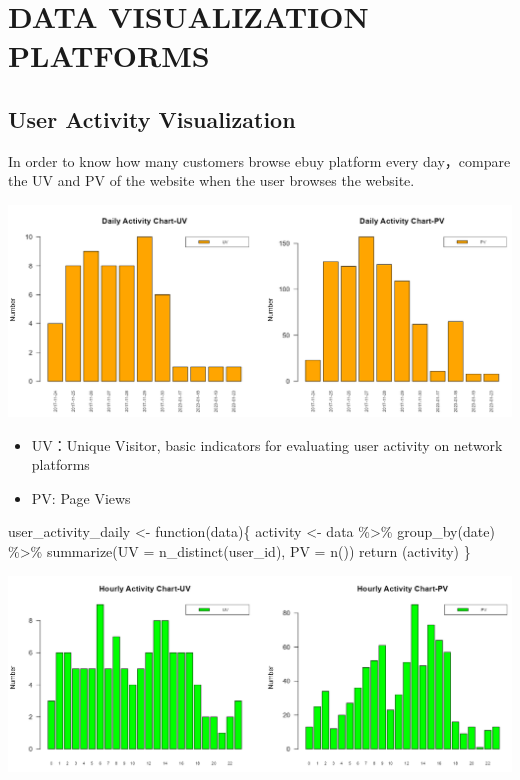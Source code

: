 \documentclass[
  11pt,
]{article}
\newenvironment{Shaded}{\begin{snugshade}}{\end{snugshade}}
\newcommand{\AttributeTok}[1]{\textcolor[rgb]{0.40,0.45,0.13}{#1}}
\newcommand{\ControlFlowTok}[1]{\textcolor[rgb]{0.00,0.23,0.31}{#1}}
\newcommand{\FunctionTok}[1]{\textcolor[rgb]{0.28,0.35,0.67}{#1}}
\newcommand{\NormalTok}[1]{\textcolor[rgb]{0.00,0.23,0.31}{#1}}
\newcommand{\OtherTok}[1]{\textcolor[rgb]{0.00,0.23,0.31}{#1}}
\newcommand{\SpecialCharTok}[1]{\textcolor[rgb]{0.37,0.37,0.37}{#1}}
\begin{document}
\hypertarget{data-visualization-platforms}{%
\section{DATA VISUALIZATION
PLATFORMS}\label{data-visualization-platforms}}

\hypertarget{user-activity-visualization}{%
\subsection{User Activity
Visualization}\label{user-activity-visualization}}

In order to know how many customers browse ebuy platform every
day，compare the UV and PV of the website when the user browses the
website.

\includegraphics{img/pv_uv.png}

\begin{itemize}
\item
  UV：Unique Visitor, basic indicators for evaluating user activity on
  network platforms
\item
  PV: Page Views
\end{itemize}

\begin{Shaded}
\begin{Highlighting}[]
\NormalTok{user\_activity\_daily }\OtherTok{\textless{}{-}} \ControlFlowTok{function}\NormalTok{(data)\{}
\NormalTok{  activity }\OtherTok{\textless{}{-}}\NormalTok{ data }\SpecialCharTok{\%\textgreater{}\%}
    \FunctionTok{group\_by}\NormalTok{(date) }\SpecialCharTok{\%\textgreater{}\%}
    \FunctionTok{summarize}\NormalTok{(}\AttributeTok{UV =} \FunctionTok{n\_distinct}\NormalTok{(user\_id), }\AttributeTok{PV =} \FunctionTok{n}\NormalTok{())}
  \FunctionTok{return}\NormalTok{ (activity)}
\NormalTok{\}}
\end{Highlighting}
\end{Shaded}

\includegraphics{img/pv_uv_2.png}
\end{document}
